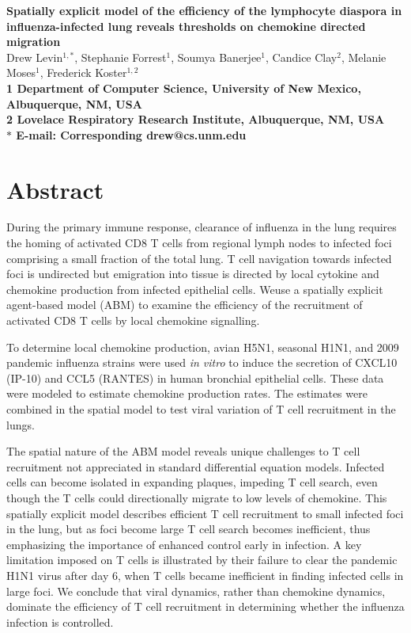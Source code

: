 \documentclass[10pt]{article}
\date{}
\begin{document}
\begin{flushleft}
{\Large
\textbf{Spatially explicit model of the efficiency of the lymphocyte diaspora in influenza-infected lung reveals thresholds on chemokine directed migration}
}
\\
Drew Levin$^{1,\ast}$, 
Stephanie Forrest$^{1}$, 
Soumya Banerjee$^{1}$,
Candice Clay$^{2}$, 
Melanie Moses$^{1}$, 
Frederick Koster$^{1,2}$
\\
\bf{1} Department of Computer Science, University of New Mexico, Albuquerque, NM, USA
\\
\bf{2} Lovelace Respiratory Research Institute, Albuquerque, NM, USA
\\
$\ast$ E-mail: Corresponding drew@cs.unm.edu
\end{flushleft}



\section*{Abstract}

During the primary immune response, clearance of influenza in the lung requires the homing of activated CD8 T cells from regional lymph nodes to infected foci comprising a small fraction of the total lung.  T cell navigation towards infected foci is undirected but emigration into tissue is directed by local cytokine and chemokine production from infected epithelial cells.  Weuse a spatially explicit agent-based model (ABM) to examine the efficiency of the recruitment of activated CD8 T cells by local chemokine signalling. 

To determine local chemokine production, avian H5N1, seasonal H1N1, and 2009 pandemic influenza strains were used \textit{in vitro} to induce the secretion of CXCL10 (IP-10) and CCL5 (RANTES) in human bronchial epithelial cells.  These data were modeled to estimate chemokine production rates. The estimates were combined in the spatial model to test viral variation of T cell recruitment in the lungs.

The spatial nature of the ABM model reveals unique challenges to T cell recruitment not appreciated in standard differential equation models.  Infected cells can become isolated in expanding plaques, impeding T cell search, even though the T cells could directionally migrate to low levels of chemokine.  This spatially explicit model describes efficient T cell recruitment to small infected foci in the lung, but as foci become large T cell search becomes inefficient, thus emphasizing the importance of enhanced control early in infection. A key limitation imposed on T cells is illustrated by their failure to clear the pandemic H1N1 virus after day 6, when T cells became inefficient in finding infected cells in large foci.  We conclude that viral dynamics, rather than chemokine dynamics, dominate the efficiency of T cell recruitment in determining whether the influenza infection is controlled.
\end{document}
